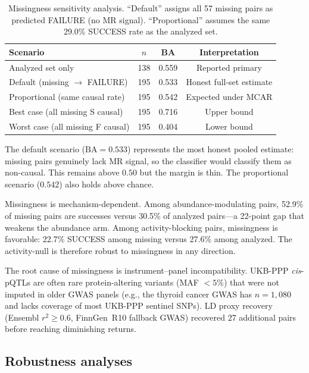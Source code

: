 \documentclass[11pt]{article}
\begin{document}
\vspace{1em}
\begin{table}[t]
\centering
\caption{Missingness sensitivity analysis. ``Default'' assigns all 57 missing pairs as predicted FAILURE (no MR signal). ``Proportional'' assumes the same 29.0\% SUCCESS rate as the analyzed set.}
\label{tab:bounds}
\begin{tabular}{lccc}
\toprule
Scenario & $n$ & BA & Interpretation \\
\midrule
Analyzed set only & 138 & 0.559 & Reported primary \\
Default (missing $\rightarrow$ FAILURE) & 195 & 0.533 & Honest full-set estimate \\
Proportional (same causal rate) & 195 & 0.542 & Expected under MCAR \\
Best case (all missing S causal) & 195 & 0.716 & Upper bound \\
Worst case (all missing F causal) & 195 & 0.404 & Lower bound \\
\bottomrule
\end{tabular}
\end{table}

The default scenario ($\text{BA} = 0.533$) represents the most honest pooled estimate: missing pairs genuinely lack MR signal, so the classifier would classify them as non-causal. This remains above $0.50$ but the margin is thin. The proportional scenario ($0.542$) also holds above chance.

Missingness is mechanism-dependent. Among abundance-modulating pairs, 52.9\% of missing pairs are successes versus 30.5\% of analyzed pairs---a 22-point gap that weakens the abundance arm. Among activity-blocking pairs, missingness is favorable: 22.7\% SUCCESS among missing versus 27.6\% among analyzed. The activity-null is therefore robust to missingness in any direction.

The root cause of missingness is instrument--panel incompatibility. UKB-PPP \emph{cis}-pQTLs are often rare protein-altering variants (MAF $< 5\%$) that were not imputed in older GWAS panels (e.g., the thyroid cancer GWAS has $n = 1{,}080$ and lacks coverage of most UKB-PPP sentinel SNPs). LD proxy recovery (Ensembl $r^2 \geq 0.6$, FinnGen~R10 fallback GWAS) recovered 27 additional pairs before reaching diminishing returns.

\subsection{Robustness analyses}
\label{sec:robustness}
\end{document}
